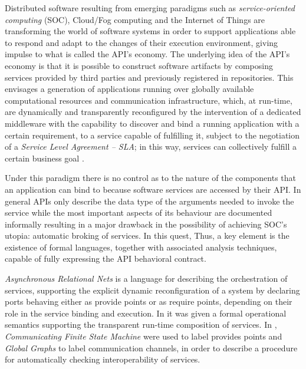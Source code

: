 
Distributed software resulting from emerging paradigms such as \emph{service-oriented computing} (SOC), Cloud/Fog computing and the Internet of Things are transforming the world of software systems in order to support applications able to respond and adapt to the changes of their execution environment, giving impulse to what is called the API's economy. The underlying idea of the API's economy is that it is possible to construct software artifacts by composing services provided by third parties and previously registered in repositories. This envisages a generation of applications running over globally available computational resources and communication infrastructure, which, at run-time, are dynamically and transparently reconfigured by the intervention of a dedicated middleware with the capability to discover and bind a running application with a certain requirement, to a service capable of fulfilling it, subject to the negotiation of a \emph{Service Level Agreement -- SLA}; in this way, services can collectively fulfill a certain business goal 
\cite{fiadeiro:fac_23-4}.

Under this paradigm there is no control as to the nature of the components that an application can bind to because 
software services are accessed by their API. In general APIs only describe the data type of the arguments needed to invoke the service while the most important aspects of its behaviour are documented informally resulting in a major drawback in the possibility of achieving SOC's utopia: automatic broking of services. In this quest, 
Thus, a key element is the existence of formal languages, together with associated analysis techniques, capable of fully expressing the API behavioral contract.

\emph{Asynchronous Relational Nets} \cite{fiadeiro:fase2011} is a language for describing the orchestration of services, supporting the explicit dynamic reconfiguration of a system by declaring ports behaving either as provide points or as require points, depending on their role in the service binding and execution. In \cite{vissani:wadt14-f} it was given a formal operational semantics supporting the transparent run-time composition of services. In \cite{vissani:places15}, \emph{Communicating Finite State Machine} \cite{brand:jacm-30_2} were used to label provides points and \emph{Global Graphs} \cite{denielou:esop12} to label communication channels, in order to describe a procedure for automatically checking interoperability of services.

